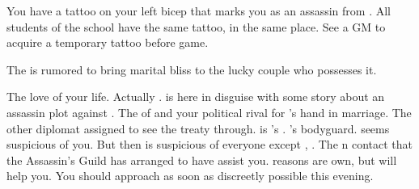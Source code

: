 \documentclass[char]{NeptuneBall}
\begin{document}
\begin{itemz}[Notes]
  \item You have a tattoo on your left bicep that marks you as an assassin from \pAssassin{}. All students of the school have the same tattoo, in the same place. See a GM to acquire a temporary tattoo before game.
\end{itemz}

\begin{itemz}[Trivia]
  \item The \iGlowShell{} is rumored to bring marital bliss to the lucky couple who possesses it.
\end{itemz}

\begin{contacts}
  \contact{\cPrincess{}} The love of your life.
  \contact{\cQueen{\MYname}} Actually \cQueen{}. \cQueen{\They} is here in disguise with some story about an assassin plot against \cKing{\King} \cKing{}.
  \contact{\cPrince{}} The \cPrince{\prince} of \pPacifica{} and your political rival for \cPrincess{}'s hand in marriage.
  \contact{\cSpy{}} The other diplomat assigned to see the treaty through. \cSpy{} is \cBodyguard{}'s \cSpy{\sibling}.
  \contact{\cBodyguard{}} \cPrince{}'s bodyguard. \cBodyguard{\They} seems suspicious of you. But then \cBodyguard{\they} is suspicious of everyone except \cBodyguard{\them} \cSpy{\sibling}, \cSpy{}.
  \contact{\cManta{}} The \pAtlantis{}n contact that the Assassin's Guild has arranged to have assist you. \cManta{\Their} reasons are \cManta{\their} own, but \cManta{\they} will help you. You should approach \cManta{\them} as soon as discreetly possible this evening.
\end{contacts}
\end{document}
